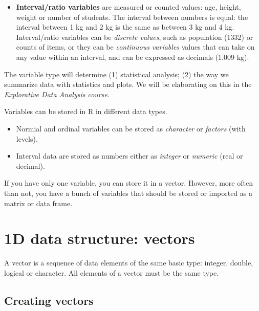 \documentclass[]{book}
\providecommand{\tightlist}{%
  \setlength{\itemsep}{0pt}\setlength{\parskip}{0pt}}
\begin{document}
\begin{itemize}
\tightlist
\item
  \textbf{Interval/ratio variables} are measured or counted values: age,
  height, weight or number of students. The interval between numbers is
  equal: the interval between 1 kg and 2 kg is the same as between 3 kg
  and 4 kg. Interval/ratio variables can be \emph{discrete values}, such
  as population (1332) or counts of items, or they can be
  \emph{continuous variables} values that can take on any value within
  an interval, and can be expressed as decimals (1.009 kg).
\end{itemize}

The variable type will determine (1) statistical analysis; (2) the way
we summarize data with statistics and plots. We will be elaborating on
this in the \emph{Explorative Data Analysis course}.

Variables can be stored in R in different data types.

\begin{itemize}
\item
  Normial and ordinal variables can be stored as \emph{character} or
  \emph{factors} (with levels).
\item
  Interval data are stored as numbers either as \emph{integer} or
  \emph{numeric} (real or decimal).
\end{itemize}

If you have only one variable, you can store it in a vector. However,
more often than not, you have a bunch of variables that should be stored
or imported as a matrix or data frame.

\section{1D data structure: vectors}\label{d-data-structure-vectors}

A vector is a sequence of data elements of the same basic type: integer,
double, logical or character. All elements of a vector must be the same
type.

\subsection{Creating vectors}\label{creating-vectors}
\end{document}
